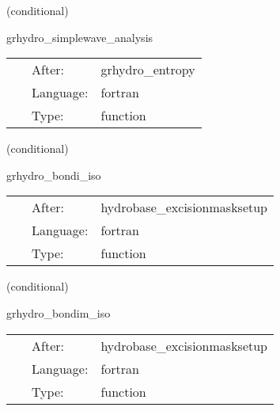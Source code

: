 \vspace{5mm}

   (conditional) 

\hspace{5mm} grhydro\_simplewave\_analysis 

\hspace{5mm}{\it compute some output variables for the simple wave } 


\hspace{5mm}

 \begin{tabular*}{160mm}{cll} 
~ & After:  & grhydro\_entropy \\ 
~ & Language:  & fortran \\ 
~ & Type:  & function \\ 
\end{tabular*} 


\vspace{5mm}

   (conditional) 

\hspace{5mm} grhydro\_bondi\_iso 

\hspace{5mm}{\it setup grhydro vars for the hydrodynamic bondi solution } 


\hspace{5mm}

 \begin{tabular*}{160mm}{cll} 
~ & After:  & hydrobase\_excisionmasksetup \\ 
~ & Language:  & fortran \\ 
~ & Type:  & function \\ 
\end{tabular*} 


\vspace{5mm}

   (conditional) 

\hspace{5mm} grhydro\_bondim\_iso 

\hspace{5mm}{\it setup grhydro vars for the magnetized bondi solution } 


\hspace{5mm}

 \begin{tabular*}{160mm}{cll} 
~ & After:  & hydrobase\_excisionmasksetup \\ 
~ & Language:  & fortran \\ 
~ & Type:  & function \\ 
\end{tabular*} 


